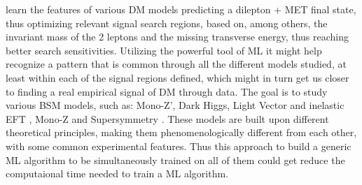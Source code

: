 \documentclass[12pt, a4paper]{book}
\begin{document}
learn the features of various DM models predicting a dilepton + MET final state, thus optimizing relevant signal search regions, based on, among others, the invariant mass of the 2 leptons and the missing transverse energy, thus reaching better search sensitivities. 
Utilizing the powerful tool of ML it might help recognize a pattern that is common through all the different models studied, at least within each of the signal regions defined, which might in turn get us closer to finding a real empirical signal of DM through data. 
The goal is to study various BSM models, such as: Mono-Z', Dark Higgs, Light Vector and inelastic EFT \cite{Zp_DM_candidate2}, Mono-Z \cite{article} and Supersymmetry \cite{JUNGMAN1996195}. 
These models are built upon different theoretical principles, making them phenomenologically different from each other, with some common experimental features. Thus this approach to build a generic ML algorithm to be simultaneously trained on all of them 
could get reduce the computaional time needed to train a ML algorithm.
\end{document}
